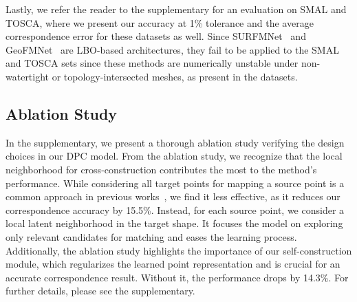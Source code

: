 Lastly, we refer the reader to the supplementary for an evaluation on SMAL and TOSCA, where we present our accuracy at 1\% tolerance and the average correspondence error for these datasets as well. Since SURFMNet~\cite{roufosse2019unsupervised} and GeoFMNet~\cite{donati2020deep} are LBO-based architectures, they fail to be applied to the SMAL and TOSCA sets since these methods are numerically unstable under non-watertight or topology-intersected meshes, as present in the datasets.



\subsection{Ablation Study} \label{subsec:ablation_study}
In the supplementary, we present a thorough ablation study verifying the design choices in our DPC model. From the ablation study, we recognize that the local neighborhood for cross-construction contributes the most to the method's performance. While considering all target points for mapping a source point is a common approach in previous works~\cite{wang2019deep, zeng2020corrnet3d, eisenberger2021neuromorph}, we find it less effective, as it reduces our correspondence accuracy by 15.5\%. Instead, for each source point, we consider a local latent neighborhood in the target shape. It focuses the model on exploring only relevant candidates for matching and eases the learning process. Additionally, the ablation study highlights the importance of our self-construction module, which regularizes the learned point representation and is crucial for an accurate correspondence result. Without it, the performance drops by 14.3\%. For further details, please see the supplementary.



%
